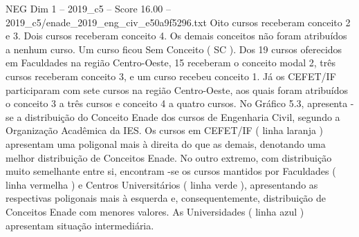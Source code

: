 \begin{textsample}{NEG Dim 1 – 2019\_c5 – Score 16.00 – 2019\_c5/enade\_2019\_eng\_civ\_e50a9f5296.txt}
Oito cursos receberam conceito 2 e 3.
Dois cursos receberam conceito 4.
Os demais conceitos não foram atribuídos a nenhum curso.
Um curso ficou Sem Conceito ( SC ).
Dos 19 cursos oferecidos em Faculdades na região Centro-Oeste, 15 receberam o conceito modal 2, três cursos receberam conceito 3, e um curso recebeu conceito 1.
Já os CEFET/IF participaram com sete cursos na região Centro-Oeste, aos quais foram atribuídos o conceito 3 a três cursos e conceito 4 a quatro cursos.
No Gráfico 5.3, apresenta -se a distribuição do Conceito Enade dos cursos de Engenharia Civil, segundo a Organização Acadêmica da IES.
Os cursos em CEFET/IF ( linha laranja ) apresentam uma poligonal mais à direita do que as demais, denotando uma melhor distribuição de Conceitos Enade.
No outro extremo, com distribuição muito semelhante entre si, encontram -se os cursos mantidos por Faculdades ( linha vermelha ) e Centros Universitários ( linha verde ), apresentando as respectivas poligonais mais à esquerda e, consequentemente, distribuição de Conceitos Enade com menores valores.
As Universidades ( linha azul ) apresentam situação intermediária.

\end{textsample}
